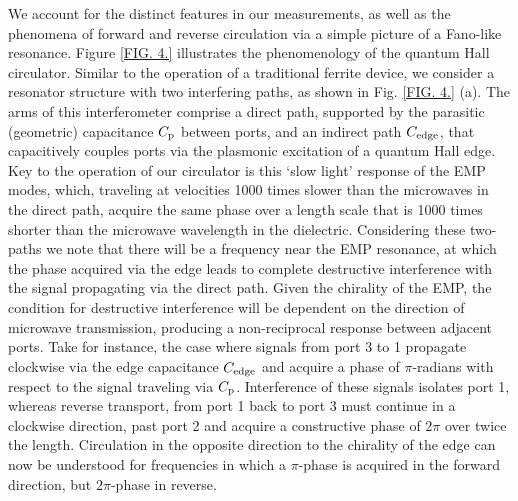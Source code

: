 We account for the distinct features in our measurements, as well as the phenomena of forward and reverse circulation via a simple picture of a Fano-like resonance. Figure \ref{FIG. 4.} illustrates the phenomenology of the quantum Hall circulator. Similar to the operation of a traditional ferrite device, we consider a resonator structure with two interfering paths, as shown in Fig. \ref{FIG. 4.} (a). The arms of this interferometer comprise a direct path, supported by the parasitic (geometric) capacitance $C_{\rm p}$ between ports, and an indirect path $C_{\rm edge}$, that capacitively couples ports via the plasmonic excitation of a quantum Hall edge. Key to the operation of our circulator is this `slow light' response of the EMP modes, which, traveling at velocities 1000 times slower than the microwaves in the direct path, acquire the same phase over a length scale that is 1000 times shorter than the microwave wavelength in the dielectric. Considering these two-paths we note that there will be a frequency near the EMP resonance, at which the phase acquired via the edge leads to complete destructive interference with the signal propagating via the direct path. Given the chirality of the EMP, the condition for destructive interference will be dependent on the direction of microwave transmission, producing a non-reciprocal response between adjacent ports. Take for instance, the case where signals from port 3 to 1 propagate clockwise via the edge capacitance $C_{\rm edge}$ and acquire a phase of $\pi$-radians with respect to the signal traveling via $C_{\rm p}$. Interference of these signals isolates port 1, whereas reverse transport, from port 1 back to port 3 must continue in a clockwise direction, past port 2 and acquire a constructive phase of $2 \pi$ over twice the length. Circulation in the opposite direction to the chirality of the edge can now be understood for frequencies in which a $\pi$-phase is acquired in the forward direction, but $2 \pi$-phase in reverse.

